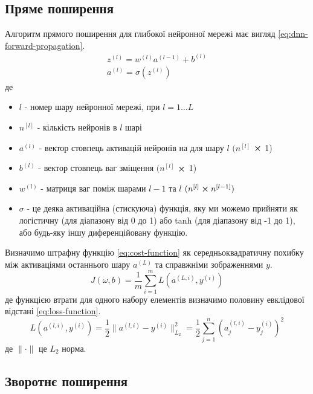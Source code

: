 \documentclass[14pt,a4paper]{extarticle}
\newcounter{e}
\numberwithin{equation}{section}
\numberwithin{figure}{section}
\newcommand{\ith}{^{(i)}}
\newcommand{\lth}{^{(l)}}
\begin{document}
	\subsection{Пряме поширення}
	Алгоритм прямого поширення для глибокої нейронної мережі має вигляд \ref{eq:dnn-forward-propagation}.
	\begin{equation}
		\label{eq:dnn-forward-propagation}
		\begin{array}{l}
			\displaystyle
			z\lth=w^{(l)} a^{(l-1)}+b\lth
			\\[0.7cm]
			
			\displaystyle
			a\lth=\sigma (z\lth)
		\end{array}
	\end{equation}
	де
	\begin{itemize}
		\item $l$ - номер шару нейронної мережі, при $l = 1 \dotsc L$
		\item $n^{[l]}$ - кількість нейронів в $l$ шарі
		\item $a\lth$ - вектор стовпець активацій нейронів на для шару $l$ $(n^{[l]}$ $\cross$ 1)
		\item $b\lth$ - вектор стовпець ваг зміщення $(n^{[l]}$ $\cross$ 1)
		\item $w\lth$ - матриця ваг поміж шарами $l-1$ та $l$ $(n^{[l]} \cross n^{[l - 1]})$ 
		\item $\sigma$ - це деяка активаційна (стискуюча) функція, яку ми можемо прийняти як логістичну (для діапазону від 0 до 1) або tanh (для діапазону від -1 до 1), або будь-яку іншу диференційовану функцію.
	\end{itemize}
	
	Визначимо штрафну функцію \ref{eq:cost-function} як середньоквадратичну похибку між активаціями останнього шару $a^{(L)}$ та справжніми зображеннями $y$.
	\begin{equation}
		\label{eq:cost-function}
		J(\omega, b) =  \frac{1}{m}  \sum_{i=1}^{m} L(a^{(L, i)}, y\ith)
	\end{equation}
	де функцією втрати для одного набору елементів визначимо половину евклідової відстані \ref{eq:loss-function}.
	\begin{equation}
		\label{eq:loss-function}
		L(a^{(l, i)}, y\ith)  =  \frac{1}{2}  \| a^{(l, i)}  - y\ith \|_{L_2}^{2} = \frac{1}{2} \sum_{j=1}^{n}  (a^{(l, i)}_j -  y\ith_j)^2
	\end{equation}
	де $\| \cdot \|$ це $L_2$ норма.

	\subsection{Зворотнє поширення}
\end{document}

